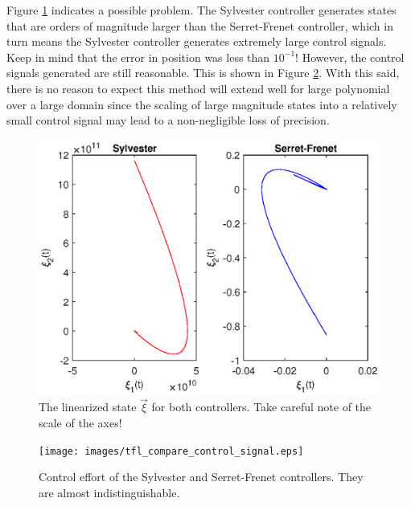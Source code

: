 \documentclass[oneside, 11pt]{book}
\begin{document}
Figure \ref{fig:tfl_compare_state} indicates a possible problem. The Sylvester controller generates states that are orders of magnitude larger than the Serret-Frenet controller, which in turn means the Sylvester controller generates extremely large control signals. Keep in mind that the error in position was less than $10^{-1}$! However, the control signals generated are still reasonable. This is shown in Figure \ref{fig:control_effort}. With this said, there is no reason to expect this method will extend well for large polynomial over a large domain since the scaling of large magnitude states into a relatively small control signal may lead to a non-negligible loss of precision.

\begin{figure}[!htbp]
    \centering
    \includegraphics{images/tfl_compare_state.eps}
    \caption{The linearized state $\vec{\xi}$ for both controllers. Take careful note of the scale of the axes!}
    \label{fig:tfl_compare_state}
\end{figure}

\begin{figure}[!htbp]
    \centering
    \texttt{[image: images/tfl\_compare\_control\_signal.eps]}
    \caption{Control effort of the Sylvester and Serret-Frenet controllers. They are almost indistinguishable.}
    \label{fig:control_effort}
\end{figure}
\end{document}
